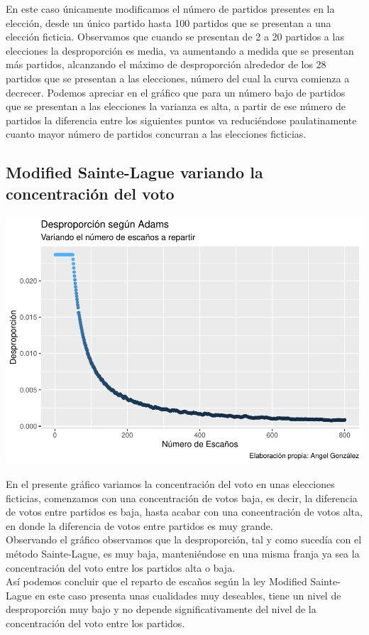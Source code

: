\documentclass[12pt,a4paper,]{book}
\numberwithin{dummy}{section}
\theoremstyle{ocrenumbox}
\theoremstyle{blacknumex}
\theoremstyle{blacknumbox}
\theoremstyle{ocrenum}
\theoremstyle{ocrenum}
\begin{document}
En este caso únicamente modificamos el número de partidos presentes en
la elección, desde un único partido hasta 100 partidos que se presentan
a una elección ficticia. Observamos que cuando se presentan de 2 a 20
partidos a las elecciones la desproporción es media, va aumentando a
medida que se presentan más partidos, alcanzando el máximo de
desproporción alrededor de los 28 partidos que se presentan a las
elecciones, número del cual la curva comienza a decrecer. Podemos
apreciar en el gráfico que para un número bajo de partidos que se
presentan a las elecciones la varianza es alta, a partir de ese número
de partidos la diferencia entre los siguientes puntos va reduciéndose
paulatinamente cuanto mayor número de partidos concurran a las
elecciones ficticias.

\hypertarget{modified-sainte-lague-variando-la-concentraciuxf3n-del-voto}{%
\subsection{Modified Sainte-Lague variando la concentración del
voto}\label{modified-sainte-lague-variando-la-concentraciuxf3n-del-voto}}

\begin{center}\includegraphics[width=0.95\linewidth]{figurasR/unnamed-chunk-30-1} \end{center}

En el presente gráfico variamos la concentración del voto en unas
elecciones ficticias, comenzamos con una concentración de votos baja, es
decir, la diferencia de votos entre partidos es baja, hasta acabar con
una concentración de votos alta, en donde la diferencia de votos entre
partidos es muy grande.\\
Observando el gráfico observamos que la desproporción, tal y como
sucedía con el método Sainte-Lague, es muy baja, manteniéndose en una
misma franja ya sea la concentración del voto entre los partidos alta o
baja.\\
Así podemos concluir que el reparto de escaños según la ley Modified
Sainte-Lague en este caso presenta unas cualidades muy deseables, tiene
un nivel de desproporción muy bajo y no depende significativamente del
nivel de la concentración del voto entre los partidos.
\end{document}
